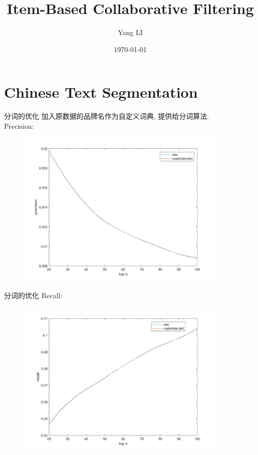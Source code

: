 \documentclass{beamer}
\title{Item-Based Collaborative Filtering}
\date{\today}
\author{Yang LI}
\institute{School of Software Engineering, Tongji University}
\begin{document}
  \maketitle
  \section{Chinese Text Segmentation}
  \begin{frame}{分词的优化}
    加入原数据的品牌名作为自定义词典, 提供给分词算法.\\
    Precision:
    \begin{figure}
      \centering
      \includegraphics[width=0.9\textwidth]{Nov-16/fig1.png}
    \end{figure}
  \end{frame}
  \begin{frame}{分词的优化}
    Recall:
    \begin{figure}
      \centering
      \includegraphics[width=0.9\textwidth]{Nov-16/fig2.png}
    \end{figure}
  \end{frame}
\end{document}
